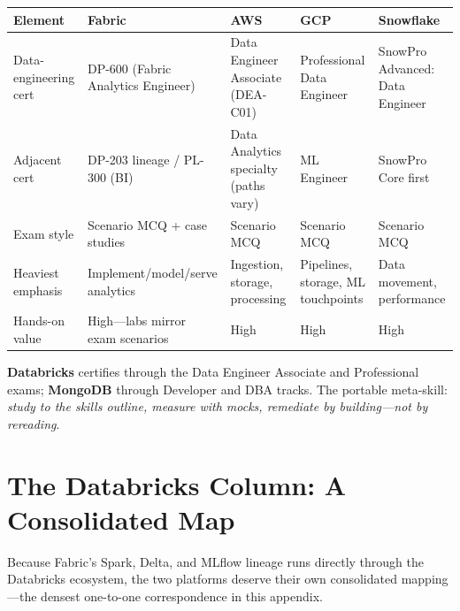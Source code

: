 \begin{center}
\footnotesize
\begin{tabular}{@{}p{2.8cm}p{3.2cm}p{3.2cm}p{3.2cm}p{3.2cm}@{}}
\toprule
\textbf{Element} & \textbf{Fabric} & \textbf{AWS} & \textbf{GCP} & \textbf{Snowflake} \\
\midrule
Data-engineering cert & DP-600 (Fabric Analytics Engineer) & Data Engineer Associate (DEA-C01) & Professional Data Engineer & SnowPro Advanced: Data Engineer \\
Adjacent cert & DP-203 lineage / PL-300 (BI) & Data Analytics specialty (paths vary) & ML Engineer & SnowPro Core first \\
Exam style & Scenario MCQ + case studies & Scenario MCQ & Scenario MCQ & Scenario MCQ \\
Heaviest emphasis & Implement/model/serve analytics & Ingestion, storage, processing & Pipelines, storage, ML touchpoints & Data movement, performance \\
Hands-on value & High---labs mirror exam scenarios & High & High & High \\
\bottomrule
\end{tabular}
\end{center}

\noindent \textbf{Databricks} certifies through the Data Engineer Associate and Professional
exams; \textbf{MongoDB} through Developer and DBA tracks. The portable meta-skill: \emph{study
to the skills outline, measure with mocks, remediate by building---not by rereading}.

\section{The Databricks Column: A Consolidated Map}
%
Because Fabric's Spark, Delta, and MLflow lineage runs directly through the Databricks
ecosystem, the two platforms deserve their own consolidated mapping---the densest one-to-one
correspondence in this appendix.

